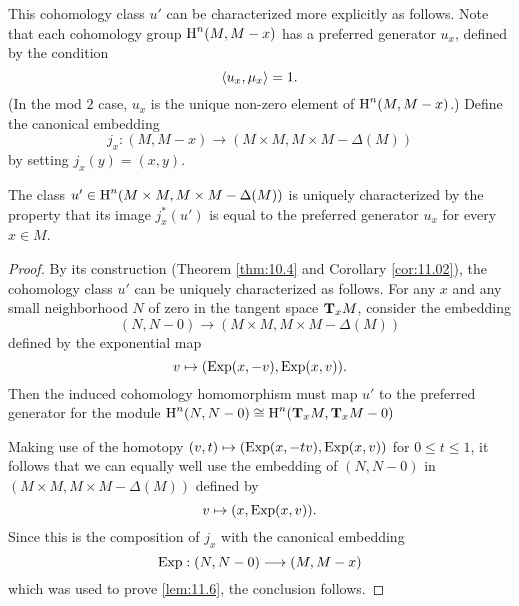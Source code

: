 \documentclass[../main]{subfiles}
\begin{document}
This cohomology class $u'$ can be characterized more explicitly as follows. Note that each cohomology group $\homology^n(M, M - x)$ has a preferred generator $u_x$, defined by the condition \[\ip {u_x} {\mu_x} = 1.\] (In the mod $2$ case, $u_x$ is the unique non-zero element of $\homology^n(M, M - x)$.) Define the canonical embedding \[j_x : (M, M - x) \longrightarrow (M \times M, M \times M - \Delta(M))\] by setting $j_x(y) = (x, y)$. 

\begin{lemma}
\label{lem:11.7}
The class $u' \in \homology^n(M \times M, M \times M - \Delta(M))$ is uniquely characterized by the property that its image $j_x^\ast(u')$ is equal to the preferred generator $u_x$ for every $x \in M$. 
\end{lemma}

\begin{proof}
By its construction (Theorem \ref{thm:10.4} and Corollary \ref{cor:11.02}), the cohomology class $u'$ can be uniquely characterized as follows. For any $x$ and any small neighborhood $N$ of zero in the tangent space $\tangentspace M x$, consider the embedding \[(N, N - 0) \longrightarrow (M \times M, M \times M - \Delta(M))\] defined by the exponential map \[v \mapsto (\Exp(x, - v), \Exp(x, v)).\] Then the induced cohomology homomorphism must map $u'$ to the preferred generator for the module $\homology^n(N, N - 0) \cong \homology^n(\tangentspace M x, \tangentspace M x - 0)$ 

Making use of the homotopy $(v, t) \mapsto (\Exp(x, - tv), \Exp(x, v))$ for $0 \le t \le 1$, it follows that we can equally well use the embedding of $(N, N - 0)$ in \newline $(M \times M, M \times M - \Delta(M))$ defined by \[v \mapsto (x, \Exp(x, v)).\] Since this is the composition of $j_x$ with the canonical embedding \[\Exp : (N, N - 0) \longrightarrow (M, M - x)\] which was used to prove \ref{lem:11.6}, the conclusion follows.
\end{proof}
\end{document}
